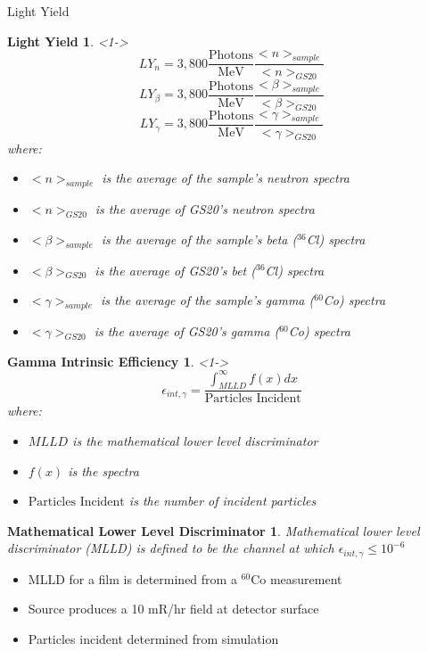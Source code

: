 \begin{frame}{Light Yield}
	\newtheorem{thm7}{Light Yield}
	\begin{thm7}<1->
	\tiny
	$$ LY_{n} = 3,800 \frac{\text{Photons}}{\text{MeV}}\frac{<n>_{sample}}{<n>_{GS20}} $$
	$$ LY_{\beta} = 3,800 \frac{\text{Photons}}{\text{MeV}}\frac{<\beta>_{sample}}{<\beta>_{GS20}} $$
	$$ LY_{\gamma} = 3,800 \frac{\text{Photons}}{\text{MeV}}\frac{<\gamma>_{sample}}{<\gamma>_{GS20}} $$
		where:
		\begin{itemize}
			\tiny
			\item $<n>_{sample}$ is the average of the sample's neutron spectra
			\item $<n>_{GS20}$ is the average of GS20's neutron spectra
			\item $<\beta>_{sample}$ is the average of the sample's beta (${}^{36}$Cl) spectra
			\item $<\beta>_{GS20}$ is the average of GS20's bet (${}^{36}$Cl) spectra
			\item $<\gamma>_{sample}$ is the average of the sample's gamma (${}^{60}$Co) spectra
			\item $<\gamma>_{GS20}$ is the average of GS20's gamma (${}^{60}$Co) spectra
		\end{itemize}
	\end{thm7}
\end{frame}
\begin{frame}
	\newtheorem{thm8}{Gamma Intrinsic Efficiency}
	\begin{thm8}<1->
		$$ \epsilon_{int,\gamma} = \frac{\int_{MLLD}^{\infty}{f(x)dx}}{\text{Particles Incident}} $$
	where:
	\begin{itemize}
		\tiny
		\item $MLLD$ is the mathematical lower level discriminator
		\item $f(x)$ is the spectra
		\item $\text{Particles Incident}$ is the number of incident particles
	\end{itemize}
	\end{thm8}
	\newtheorem{rmk1}{Mathematical Lower Level Discriminator}
	\begin{rmk1}
		\tiny
		Mathematical lower level discriminator (MLLD) is defined to be the channel at which $\epsilon_{int,\gamma} \leq 10^{-6}$
	\end{rmk1}

	\begin{itemize}
		\tiny
		\item MLLD for a film is determined from a ${}^{60}$Co measurement
		\item Source produces a 10 mR/hr field at detector surface
		\item Particles incident determined from simulation
	\end{itemize}
\end{frame}
